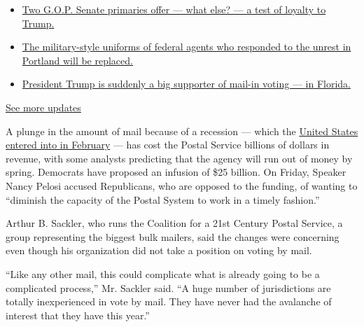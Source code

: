 \begin{itemize}
\tightlist
\item
  \href{https://www.nytimes.com/2020/08/04/us/elections/primary-election-michigan-arizona-kansas.html?action=click\&pgtype=Article\&state=default\&region=MAIN_CONTENT_1\&context=storylines_live_updates\#link-3924dd44}{Two
  G.O.P. Senate primaries offer --- what else? --- a test of loyalty to
  Trump.}
\item
  \href{https://www.nytimes.com/2020/08/04/us/elections/primary-election-michigan-arizona-kansas.html?action=click\&pgtype=Article\&state=default\&region=MAIN_CONTENT_1\&context=storylines_live_updates\#link-62a8e06b}{The
  military-style uniforms of federal agents who responded to the unrest
  in Portland will be replaced.}
\item
  \href{https://www.nytimes.com/2020/08/04/us/elections/primary-election-michigan-arizona-kansas.html?action=click\&pgtype=Article\&state=default\&region=MAIN_CONTENT_1\&context=storylines_live_updates\#link-32b39e33}{President
  Trump is suddenly a big supporter of mail-in voting --- in Florida.}
\end{itemize}

\href{https://www.nytimes.com/2020/08/04/us/elections/primary-election-michigan-arizona-kansas.html?action=click\&pgtype=Article\&state=default\&region=MAIN_CONTENT_1\&context=storylines_live_updates}{See
more updates}

A plunge in the amount of mail because of a recession --- which the
\href{https://www.nytimes.com/2020/06/08/business/economy/us-economy-recession-2020.html}{United
States entered into in February} --- has cost the Postal Service
billions of dollars in revenue, with some analysts predicting that the
agency will run out of money by spring. Democrats have proposed an
infusion of \$25 billion. On Friday, Speaker Nancy Pelosi accused
Republicans, who are opposed to the funding, of wanting to ``diminish
the capacity of the Postal System to work in a timely fashion.''

Arthur B. Sackler, who runs the Coalition for a 21st Century Postal
Service, a group representing the biggest bulk mailers, said the changes
were concerning even though his organization did not take a position on
voting by mail.

``Like any other mail, this could complicate what is already going to be
a complicated process,'' Mr. Sackler said. ``A huge number of
jurisdictions are totally inexperienced in vote by mail. They have never
had the avalanche of interest that they have this year.''

